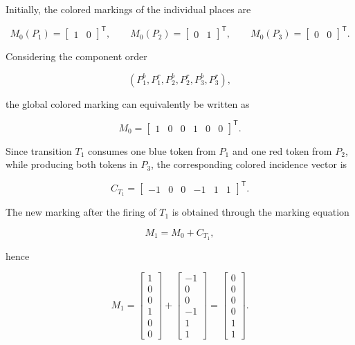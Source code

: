 \noindent Initially, the colored markings of the individual places are

\[
M_0(P_1)=
\begin{bmatrix}
	1 & 0
\end{bmatrix}^{\mathsf T},
\qquad
M_0(P_2)=
\begin{bmatrix}
	0 & 1
\end{bmatrix}^{\mathsf T},
\qquad
M_0(P_3)=
\begin{bmatrix}
	0 & 0
\end{bmatrix}^{\mathsf T}.
\]

\noindent Considering the component order

\[
(P_1^{b},P_1^{r},
P_2^{b},P_2^{r},
P_3^{b},P_3^{r}),
\]

\noindent the global colored marking can equivalently be written as

\[
M_0=
\begin{bmatrix}
	1 & 0 & 0 & 1 & 0 & 0
\end{bmatrix}^{\mathsf T}.
\]

\noindent Since transition $T_1$ consumes one blue token from $P_1$ and one red token from $P_2$, while producing both tokens in $P_3$, the corresponding colored incidence vector is

\[
C_{T_1}
=
\begin{bmatrix}
	-1 & 0 & 0 & -1 & 1 & 1
\end{bmatrix}^{\mathsf T}.
\]

\noindent The new marking after the firing of $T_1$ is obtained through the marking equation

\[
M_1=M_0+C_{T_1},
\]

\noindent hence

\[
M_1=
\begin{bmatrix}
	1\\
	0\\
	0\\
	1\\
	0\\
	0
\end{bmatrix}
+
\begin{bmatrix}
	-1\\
	0\\
	0\\
	-1\\
	1\\
	1
\end{bmatrix}
=
\begin{bmatrix}
	0\\
	0\\
	0\\
	0\\
	1\\
	1
\end{bmatrix}.
\]


